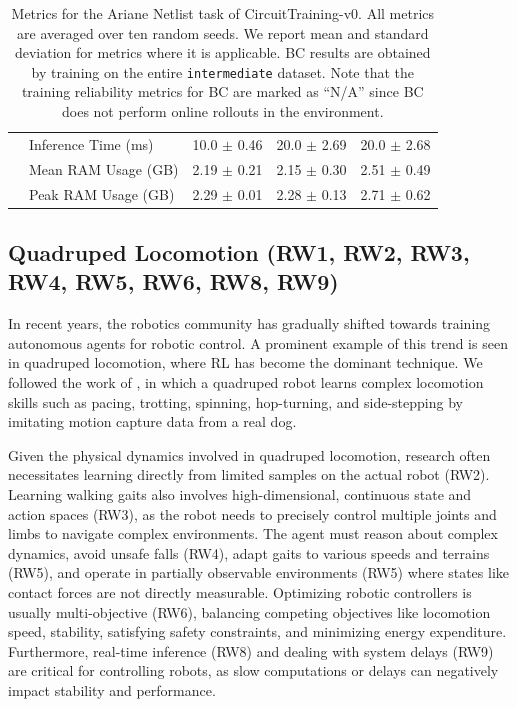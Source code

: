 \begin{table}[!t]
{\begin{tabular}{|l|l|c|c|c|}
 & Inference Time (ms) & 10.0 $\pm$ 0.46 & 20.0 $\pm$ 2.69 & 20.0 $\pm$ 2.68 \\
 & Mean RAM Usage (GB) & 2.19 $\pm$ 0.21 & 2.15 $\pm$ 0.30 & 2.51 $\pm$ 0.49 \\
 & Peak RAM Usage (GB) & 2.29 $\pm$ 0.01 & 2.28 $\pm$ 0.13 & 2.71 $\pm$ 0.62 \\
\bottomrule
\end{tabular}
}
\caption{Metrics for the Ariane Netlist task of CircuitTraining-v0. All metrics are averaged over ten random seeds. We report mean and standard deviation for metrics where it is applicable. BC results are obtained by training on the entire \texttt{intermediate} dataset. Note that the training reliability metrics for BC are marked as ``N/A'' since BC does not perform online rollouts in the environment.}
\label{tab:metrics_circuit_training_ariane}
\vspace{-1em}
\end{table}

\subsection{Quadruped Locomotion (RW1, RW2, RW3, RW4, RW5, RW6, RW8, RW9)}
\vspace{-0.5em}
In recent years, the robotics community has gradually shifted towards training autonomous agents for robotic control.
A prominent example of this trend is seen in quadruped locomotion, where RL has become the dominant technique.
We followed the work of \citet{peng2020learning_agile_imitate}, in which a quadruped robot learns complex locomotion skills such as pacing, trotting, spinning, hop-turning, and side-stepping by imitating motion capture data from a real dog.


Given the physical dynamics involved in quadruped locomotion, research often necessitates learning directly from limited samples on the actual robot (RW2).
Learning walking gaits also involves high-dimensional, continuous state and action spaces (RW3), as the robot needs to precisely control multiple joints and limbs to navigate complex environments. The agent must reason about complex dynamics, avoid unsafe falls (RW4), adapt gaits to various speeds and terrains (RW5), and operate in partially observable environments (RW5) where states like contact forces are not directly measurable.
Optimizing robotic controllers is usually multi-objective (RW6), balancing competing objectives like locomotion speed, stability, satisfying safety constraints, and minimizing energy expenditure. Furthermore, real-time inference (RW8) and dealing with system delays (RW9) are critical for controlling robots, as slow computations or delays can negatively impact stability and performance.



